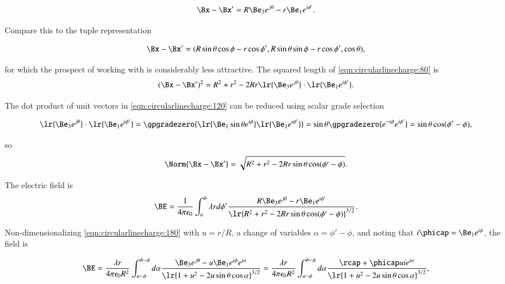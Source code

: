 \begin{dmath}\label{eqn:circularlinecharge:80}
\Bx - \Bx'
=
R \Be_3 e^{j \theta } - r \Be_1 e^{i \phi'}.
\end{dmath}

Compare this to the tuple representation

\begin{dmath}\label{eqn:circularlinecharge:100}
\Bx - \Bx'
= ( R \sin\theta \cos\phi - r \cos\phi', R \sin\theta \sin\phi - r \cos\phi', \cos\theta ),
\end{dmath}

for which the prospect of working with is considerably less attractive.
The squared length of \cref{eqn:circularlinecharge:80} is
\begin{dmath}\label{eqn:circularlinecharge:120}
(\Bx - \Bx')^2
=
R^2 + r^2 - 2 R r \lr{\Be_3 e^{j \theta} } \cdot \lr{ \Be_1 e^{i \phi'} }.
\end{dmath}

The dot product of unit vectors in \cref{eqn:circularlinecharge:120} can be reduced using scalar grade selection

\begin{dmath}\label{eqn:circularlinecharge:140}
\lr{\Be_3 e^{j \theta }} \cdot \lr{ \Be_1 e^{i \phi'} }
=
\gpgradezero{
\lr{ \Be_1 \sin\theta e^{i \phi} } \lr{ \Be_1 e^{i \phi'}}
}
=
\sin\theta
\gpgradezero{
e^{-i \phi} e^{i \phi'}
}
=
\sin\theta \cos( \phi' - \phi ),
\end{dmath}

so
\begin{dmath}\label{eqn:circularlinecharge:160}
\Norm{ \Bx - \Bx' }
=
\sqrt{
R^2 + r^2 - 2 R r \sin\theta \cos( \phi' - \phi )
}.
\end{dmath}

The electric field is
\begin{dmath}\label{eqn:circularlinecharge:180}
\BE = \frac{1}{4 \pi \epsilon_0} \int_a^b \lambda r d\phi' \frac{ R \Be_3 e^{j \theta } - r \Be_1 e^{i \phi'} }{\lr{ R^2 + r^2 - 2 R r \sin\theta \cos( \phi' - \phi ) }^{3/2} }.
\end{dmath}

Non-dimensionalizing \cref{eqn:circularlinecharge:180} with \( u = r/R \), a change of variables \( \alpha = \phi' - \phi \), and noting that \( i \phicap = \Be_1 e^{i \phi} \), the field is

\begin{dmath}\label{eqn:circularlinecharge:200}
\BE
= \frac{\lambda r}{4 \pi \epsilon_0 R^2} \int_{a-\phi}^{b-\phi} d\alpha \frac{ \Be_3 e^{j \theta } - u \Be_1 e^{i\phi} e^{i \alpha} }{\lr{ 1 + u^2 - 2 u \sin\theta \cos \alpha }^{3/2} }
= \frac{\lambda r}{4 \pi \epsilon_0 R^2} \int_{a-\phi}^{b-\phi} d\alpha \frac{ \rcap + \phicap u i e^{i \alpha } }{\lr{ 1 + u^2 - 2 u \sin\theta \cos \alpha }^{3/2} },
\end{dmath}

